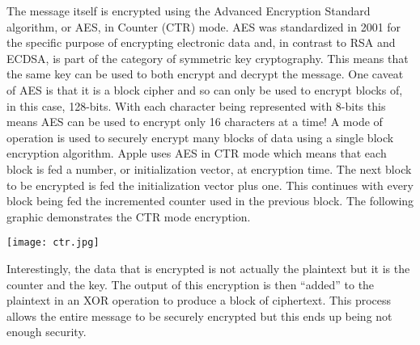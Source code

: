 The message itself is encrypted using the Advanced Encryption Standard
algorithm, or AES, in Counter (CTR) mode.  AES was standardized in 2001 for the
specific purpose of encrypting electronic data and, in contrast to RSA and
ECDSA, is part of the category of symmetric key cryptography\cite{trappe}.  This means that
the same key can be used to both encrypt and decrypt the message.  One caveat
of AES is that it is a block cipher and so can only be used to encrypt blocks
of, in this case, 128-bits.  With each character being represented with 8-bits
this means AES can be used to encrypt only 16 characters at a time!  A mode of
operation is used to securely encrypt many blocks of data using a single block
encryption algorithm.  Apple uses AES in CTR mode which means that each block
is fed a number, or initialization vector, at encryption time\cite{apple}\cite{trappe}.  
The next block
to be encrypted is fed the initialization vector plus one.  This continues with
every block being fed the incremented counter used in the previous block.  The
following graphic demonstrates the CTR mode encryption.

\begin{center}
    \texttt{[image: ctr.jpg]}
\end{center}

Interestingly, the data that is encrypted is not actually the plaintext but it
is the counter and the key.  The output of this encryption is then ``added'' to
the plaintext in an XOR operation to produce a block of ciphertext.  This
process allows the entire message to be securely encrypted but this ends up
being not enough security.


